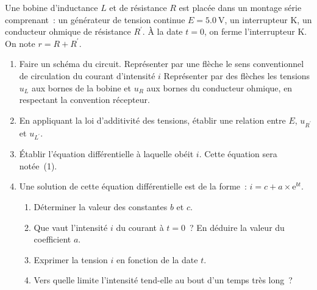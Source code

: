 Une bobine d'inductance $L$ et de résistance $R$ est placée dans un montage
série comprenant~: un générateur de tension continue $E=\qty{5.0}{\V}$, un
interrupteur $\mathrm{K}$, un conducteur ohmique de résistance $R^{\prime}$. À
la date $t=0$, on ferme l'interrupteur $\mathrm{K}$. On note $r=R+R^{\prime}$.

\begin{enumerate}
    \item Faire un schéma du circuit. Représenter par une flèche le sens
          conventionnel de circulation du courant d'intensité $i$ Représenter
          par des flèches les tensions $u_{L}$ aux bornes de la bobine et
          $u_{R}$ aux bornes du conducteur ohmique, en respectant la convention
          récepteur.
    \item En appliquant la loi d'additivité des tensions, établir une relation
          entre $E$, $u_{R^{\prime}}$ et $u_{L^{\prime}}$.
    \item Établir l'équation différentielle à laquelle obéit $i$. Cette équation
          sera notée~(1).
    \item Une solution de cette équation différentielle est de la forme~:
          $i=c+a\times\mathrm{e}^{bt}$.
          \begin{enumerate}
              \item Déterminer la valeur des constantes $b$ et $c$.
              \item Que vaut l'intensité $i$ du courant à $t=0$~? En déduire la
                    valeur du coefficient $a$.
              \item Exprimer la tension $i$ en fonction de la date $t$.
              \item Vers quelle limite l'intensité tend-elle au bout d'un temps
                    très long~?
          \end{enumerate}
\end{enumerate}


